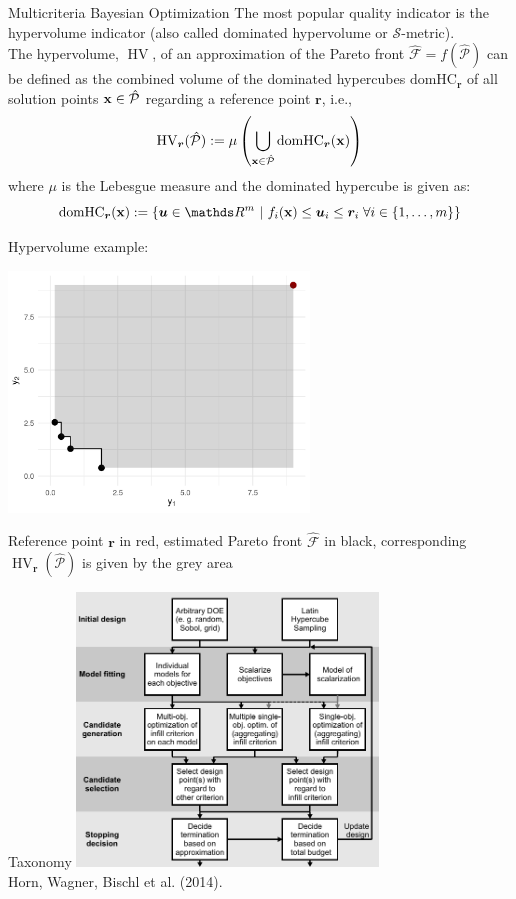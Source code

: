 \documentclass[11pt,compress,t,notes=noshow, xcolor=table]{beamer}
\begin{document}
\begin{vbframe}{Multicriteria Bayesian Optimization}
\framebreak
The most popular quality indicator is the hypervolume indicator (also called dominated hypervolume or $\mathcal{S}$-metric).\\
\vspace{1em}
The hypervolume, $\operatorname{HV}$, of an approximation of the Pareto front $\hat{\mathcal{F}} = f(\hat{\mathcal{P}})$ can be defined as the combined volume of the dominated hypercubes $\text{domHC}_{\bm{r}}$ of all solution points $\mathbf{x} \in \hat{\mathcal{P}}$ regarding a reference point $\bm{r}$, i.e.,
$$\operatorname{HV}_{\bm{r}}(\hat{\mathcal{P}}) := \mu\left(\bigcup_{\mathbf{x} \in \hat{\mathcal{P}}}\text{domHC}_{\bm{r}}(\mathbf{x})\right)$$
where $\mu$ is the Lebesgue measure and the dominated hypercube is given as:
$$\text{domHC}_{\bm{r}}(\xv) := \{\bm{u} \in \R^m~|~ f_i(\xv) \leq \bm{u}_i \leq \bm{r}_i\;\forall i \in \{1, \dots, m\}\}$$

\framebreak

Hypervolume example:

\vspace{+0.45cm}
\begin{center}
  \includegraphics[width = 0.6\textwidth]{figure_man/multicrit_1.png}
\end{center}
Reference point $\bm{r}$ in red, estimated Pareto front $\hat{\mathcal{F}}$ in black, corresponding $\operatorname{HV}_{\bm{r}}(\hat{\mathcal{P}})$ is given by the grey area

\end{vbframe}

\begin{frame}{Taxonomy}
\centering
\includegraphics[width = 0.6\textwidth]{figure_man/FlowchartMBMO.pdf}\\
Horn, Wagner, Bischl et al. (2014).
\end{frame}
\end{document}
